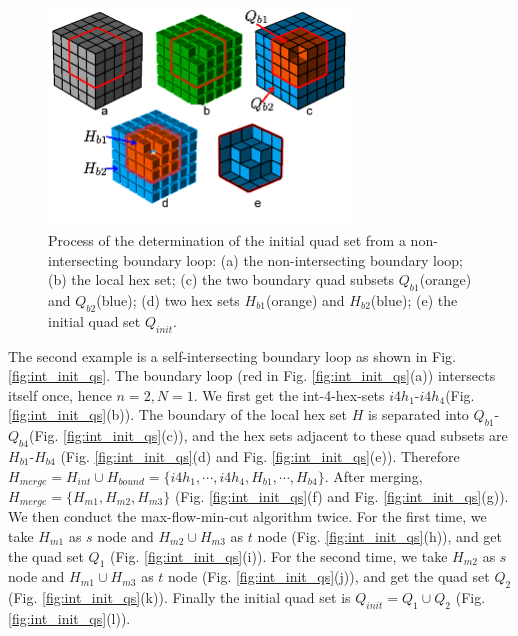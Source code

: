 \documentclass[final,5p,times,twocolumn]{elsarticle}
\begin{document}
\begin{figure}[htbp]
\begin{center}
\includegraphics[width=8cm]{non_int_init_qs.png}
\caption{Process of the determination of the initial quad set from a non-intersecting boundary loop: (a) the non-intersecting boundary loop; (b) the local hex set; (c) the two boundary quad subsets $Q_{b1}$(orange) and $Q_{b2}$(blue); (d) two hex sets $H_{b1}$(orange) and $H_{b2}$(blue); (e) the initial quad set $Q_{init}$.}
\label{fig:non_int_init_qs}
\end{center}
\end{figure}

The second example is a self-intersecting boundary loop as shown in Fig. \ref{fig:int_init_qs}. The boundary loop (red in Fig. \ref{fig:int_init_qs}(a)) intersects itself once, hence $n=2,N=1$. We first get the int-4-hex-sets $i4h_1$-$i4h_4$(Fig. \ref{fig:int_init_qs}(b)). The boundary of the local hex set $H$ is separated into $Q_{b1}$-$Q_{b4}$(Fig. \ref{fig:int_init_qs}(c)), and the hex sets adjacent to these quad subsets are $H_{b1}$-$H_{b4}$ (Fig. \ref{fig:int_init_qs}(d) and Fig. \ref{fig:int_init_qs}(e)). Therefore $H_{merge}=H_{int} \cup H_{bound}=\{i4h_1,\cdots,i4h_4,H_{b1},\cdots,H_{b4}\}$. After merging, $H_{merge}=\{H_{m1},H_{m2},H_{m3}\}$ (Fig. \ref{fig:int_init_qs}(f) and Fig. \ref{fig:int_init_qs}(g)). We then conduct the max-flow-min-cut algorithm twice. For the first time, we take $H_{m1}$ as $s$ node and $H_{m2} \cup H_{m3}$ as $t$ node (Fig. \ref{fig:int_init_qs}(h)), and get the quad set $Q_1$ (Fig. \ref{fig:int_init_qs}(i)). For the second time, we take $H_{m2}$ as $s$ node and $H_{m1} \cup H_{m3}$ as $t$ node (Fig. \ref{fig:int_init_qs}(j)), and get the quad set $Q_2$ (Fig. \ref{fig:int_init_qs}(k)). Finally the initial quad set is $Q_{init}=Q_1 \cup Q_2$ (Fig. \ref{fig:int_init_qs}(l)).
\end{document}
